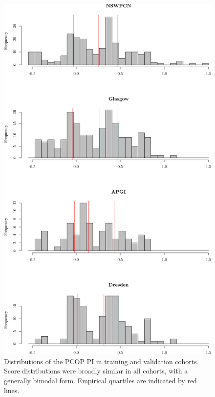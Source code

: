 \documentclass[dissertation.tex]{subfiles}
\begin{document}
\begin{figure}
\centering
  \includegraphics[width=.7\linewidth]{analysis/nomogram/figure/07-score-hists-1}
  \caption[\acrshort{PCOP} \acrshort{PI} distributions in training and validation cohorts]{Distributions of the \acrshort{PCOP} \acrshort{PI} in training and validation cohorts.  Score distributions were broadly similar in all cohorts, with a generally bimodal form.  Empirical quartiles are indicated by red lines.}
\label{fig:nomo-score-hists}
\end{figure}
\end{document}
